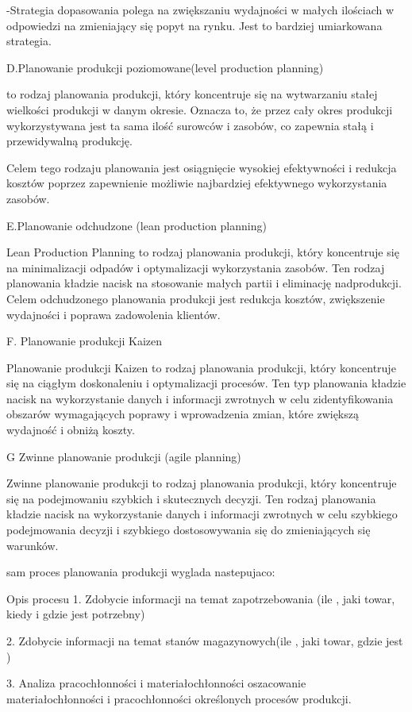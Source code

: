  -Strategia dopasowania polega na zwiększaniu wydajności w małych ilościach w odpowiedzi na zmieniający się popyt na rynku. Jest to bardziej umiarkowana strategia.

 D.Planowanie produkcji poziomowane(level production planning)

 to rodzaj planowania produkcji, który koncentruje się na wytwarzaniu stałej wielkości produkcji w danym okresie. Oznacza to, że przez cały okres produkcji wykorzystywana jest ta sama ilość surowców i zasobów, co zapewnia stałą i przewidywalną produkcję.

Celem tego rodzaju planowania jest osiągnięcie wysokiej efektywności i redukcja kosztów poprzez zapewnienie możliwie najbardziej efektywnego wykorzystania zasobów.

E.Planowanie odchudzone (lean production planning)

Lean Production Planning to rodzaj planowania produkcji, który koncentruje się na minimalizacji odpadów i optymalizacji wykorzystania zasobów. Ten rodzaj planowania kładzie nacisk na stosowanie małych partii i eliminację nadprodukcji. Celem odchudzonego planowania produkcji jest redukcja kosztów, zwiększenie wydajności i poprawa zadowolenia klientów.

F. Planowanie produkcji Kaizen

Planowanie produkcji Kaizen to rodzaj planowania produkcji, który koncentruje się na ciągłym doskonaleniu i optymalizacji procesów. Ten typ planowania kładzie nacisk na wykorzystanie danych i informacji zwrotnych w celu zidentyfikowania obszarów wymagających poprawy i wprowadzenia zmian, które zwiększą wydajność i obniżą koszty.

G Zwinne planowanie produkcji (agile planning)

Zwinne planowanie produkcji to rodzaj planowania produkcji, który koncentruje się na podejmowaniu szybkich i skutecznych decyzji. Ten rodzaj planowania kładzie nacisk na wykorzystanie danych i informacji zwrotnych w celu szybkiego podejmowania decyzji i szybkiego dostosowywania się do zmieniających się warunków.



sam proces planowania produkcji wyglada nastepujaco:

Opis procesu
1. Zdobycie informacji na temat zapotrzebowania (ile , jaki towar, kiedy i gdzie jest potrzebny)

2. Zdobycie informacji na temat stanów magazynowych(ile , jaki towar,  gdzie jest )


3. Analiza pracochłonności i materiałochłonności
oszacowanie materiałochłonności i pracochłonności określonych procesów produkcji. 

